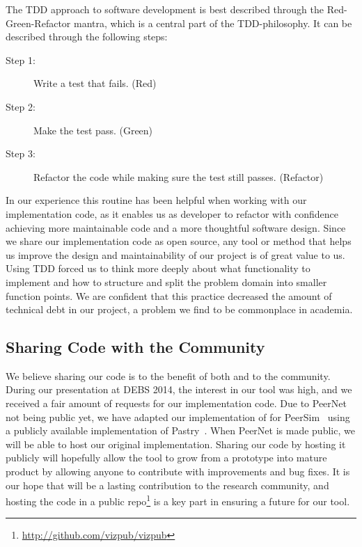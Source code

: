 The TDD approach to software development is best described through the
Red-Green-Refactor mantra, which is a central part of the
TDD-philosophy. It can be described through the following steps:

\begin{description}
    \item[Step 1:] Write a test that fails. (Red)
    \item[Step 2:] Make the test pass. (Green)
    \item[Step 3:] Refactor the code while making sure the test
        still passes. (Refactor)
\end{description}

In our experience this routine has been helpful when working
with our implementation code, as it enables us as developer to
refactor with confidence achieving more maintainable code and a
more thoughtful software design. Since we share our
implementation code as open source, any tool or method that helps us improve the
design and maintainability of our project is of great value to
us. Using TDD forced us to think more deeply about what
functionality to implement and how to structure and split the
problem domain into smaller function points. We are confident that this practice decreased the amount of
technical debt in our project, a problem we find to be commonplace in academia.

\subsection{Sharing Code with the Community}

We believe sharing our code is to the benefit of both \demo{} and to the
community. During our presentation at DEBS 2014, the interest in our
tool was high, and we received a fair amount of requests for our
implementation code. Due to PeerNet not being public yet, we have
adapted our implementation of \demo{} for PeerSim~\cite{p2p09-peersim} using a publicly
available implementation of Pastry~\cite{pastrypeersim}. When PeerNet is made public, we will
be able to host our original implementation. Sharing our code by hosting
it publicly will hopefully allow the tool to grow from a prototype into
mature product by allowing anyone to contribute with improvements and
bug fixes. It is our hope that \demo{} will be a lasting contribution to
the research community, and hosting the code in a public
repo\footnote{\url{http://github.com/vizpub/vizpub}} is a key part in
ensuring a future for our tool.
